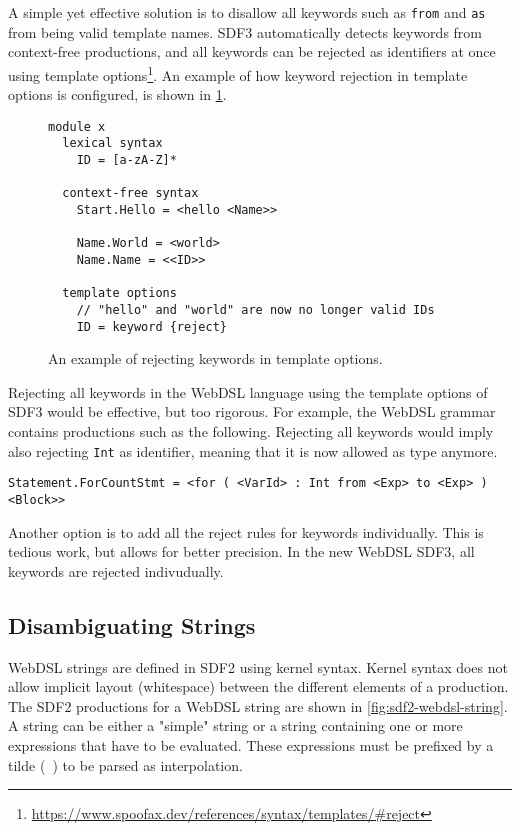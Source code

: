       A simple yet effective solution is to disallow all keywords such as \texttt{from} and \texttt{as} from being valid template names. SDF3 automatically detects keywords from context-free productions, and all keywords can be rejected as identifiers at once using template options\footnote{\url{https://www.spoofax.dev/references/syntax/templates/\#reject}}. An example of how keyword rejection in template options is configured, is shown in \cref{fig:sdf3-template-options-reject}.

      \begin{figure}
        \begin{verbatim}
module x
  lexical syntax
    ID = [a-zA-Z]*

  context-free syntax
    Start.Hello = <hello <Name>>

    Name.World = <world>
    Name.Name = <<ID>>

  template options
    // "hello" and "world" are now no longer valid IDs
    ID = keyword {reject}
        \end{verbatim}
        \caption{\label{fig:sdf3-template-options-reject}An example of rejecting keywords in template options.}
      \end{figure}

      Rejecting all keywords in the WebDSL language using the template options of SDF3 would be effective, but too rigorous. For example, the WebDSL grammar contains productions such as the following. Rejecting all keywords would imply also rejecting \texttt{Int} as identifier, meaning that it is now allowed as type anymore.
      
      \texttt{Statement.ForCountStmt = <for ( <VarId> : Int from <Exp> to <Exp> ) <Block>>}

      Another option is to add all the reject rules for keywords individually. This is tedious work, but allows for better precision. In the new WebDSL SDF3, all keywords are rejected indivudually.

    \subsection{Disambiguating Strings}

      WebDSL strings are defined in SDF2 using kernel syntax. Kernel syntax does not allow implicit layout (whitespace) between the different elements of a production. The SDF2 productions for a WebDSL string are shown in \cref{fig:sdf2-webdsl-string}. A string can be either a "simple" string or a string containing one or more expressions that have to be evaluated. These expressions must be prefixed by a tilde (\texttt{~}) to be parsed as interpolation.

